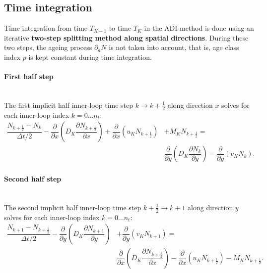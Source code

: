 \subsection{Time integration}
\label{sec:two-steps-splitting-method}
%
Time integration from time $T_{K-1}$ to time $T_K$ in the ADI method is done using an iterative \textbf{two-step splitting method along spatial directions}. During these two steps, the ageing process $\partial_a N$ is not taken into account, that is, age class index $p$ is kept constant during time integration.

\paragraph{First half step} \mbox{}\\

\noindent The first implicit half inner-loop time step $k\to k+\frac{1}{2}$ along direction $x$ solves for each inner-loop index $k=0 \dots n_t$:
\begin{align}
  \nonumber
  \dfrac{N_{k+\frac{1}{2}}-N_{k}}{\Delta t/2}
  - \dfrac{\partial}{\partial x}
  \left(
    D_K\dfrac{\partial N_{k+\frac{1}{2}}}{\partial x}
  \right)
  + \dfrac{\partial}{\partial x}
  \left(u_K N_{k+\frac{1}{2}}\right)
  &+ M_{K} N_{k+\frac{1}{2}}
  =\\ \label{eq:2steps-ADI-x}
  &\dfrac{\partial}{\partial y}
  \left(
    D_K\dfrac{\partial N_{k}}{\partial y}
  \right)
  - \dfrac{\partial}{\partial y}
  \left(v_KN_{k}\right).
\end{align}

\paragraph{Second half step} \mbox{}\\
 
\noindent The second implicit  half inner-loop time step $k+\frac{1}{2}\to k+1$ along direction $y$
solves for each inner-loop index $k=0 \dots n_t$:
\begin{align}
  \nonumber
  \dfrac{N_{k+1}-N_{k+\frac{1}{2}}}{\Delta t/2}
  - \dfrac{\partial}{\partial y}
  \left(
    D_K\dfrac{\partial N_{k+1}}{\partial y}
  \right)
  &+ \dfrac{\partial}{\partial y}
  \left(v_KN_{k+1}\right)
  =\\\label{eq:2steps-ADI-y}
  &\dfrac{\partial}{\partial x}
  \left(
    D_K\dfrac{\partial N_{k+\frac{1}{2}}}{\partial x}
  \right)
  - \dfrac{\partial}{\partial x}
  \left(u_KN_{k+\frac{1}{2}}\right)
  - M_{K}N_{k+\frac{1}{2}}.
\end{align}

